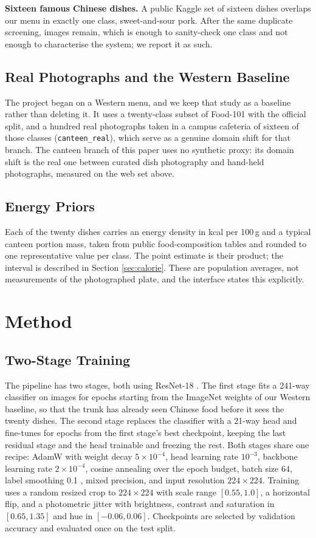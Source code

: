 \documentclass[conference]{IEEEtran}
\begin{document}
\textbf{Sixteen famous Chinese dishes.} A public Kaggle set of sixteen dishes
\cite{patzer16chinese} overlaps our menu in exactly one class,
sweet-and-sour pork. After the same duplicate screening, \extN{} images remain,
which is enough to sanity-check one class and not enough to characterise the
system; we report it as such.

\subsection{Real Photographs and the Western Baseline}
The project began on a Western menu, and we keep that study as a baseline rather
than deleting it. It uses a twenty-class subset of Food-101
\cite{bossard2014food101} with the official split, and a hundred real
photographs taken in a campus cafeteria of sixteen of those classes
(\texttt{canteen\_real}), which serve as a genuine domain shift for that branch.
The canteen branch of this paper uses no synthetic proxy: its domain shift is the
real one between curated dish photography and hand-held photographs, measured on
the web set above.

\subsection{Energy Priors}
Each of the twenty dishes carries an energy density in kcal per 100\,g and a
typical canteen portion mass, taken from public food-composition tables and
rounded to one representative value per class. The point estimate is their
product; the interval is described in Section \ref{sec:calorie}. These are
population averages, not measurements of the photographed plate, and the
interface states this explicitly.

\section{Method}
\label{sec:method}
\subsection{Two-Stage Training}
The pipeline has two stages, both using ResNet-18 \cite{he2016resnet}. The first
stage fits a 241-way classifier on \cnPreTrainN{} images for \cnPreEpochs{}
epochs starting from the ImageNet weights of our Western baseline, so that the
trunk has already seen Chinese food before it sees the twenty dishes. The second
stage replaces the classifier with a 21-way head and fine-tunes for
\cnEpochs{} epochs from the first stage's best checkpoint, keeping the last
residual stage and the head trainable and freezing the rest. Both stages share
one recipe: AdamW with weight decay $5\times10^{-4}$, head learning rate
$10^{-3}$, backbone learning rate $2\times10^{-4}$, cosine annealing over the
epoch budget, batch size 64, label smoothing 0.1
\cite{szegedy2016inception}, mixed precision, and input resolution
$224\times224$. Training uses a random resized crop to $224\times224$ with scale
range $[0.55,1.0]$, a horizontal flip, and a photometric jitter with brightness,
contrast and saturation in $[0.65,1.35]$ and hue in $[-0.06,0.06]$. Checkpoints
are selected by validation accuracy and evaluated once on the test split.
\end{document}
